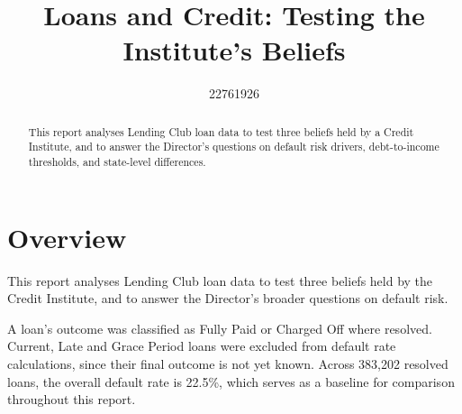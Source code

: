 \documentclass[11pt,preprint]{elsarticle}
\numberwithin{equation}{section}
\numberwithin{figure}{section}
\numberwithin{table}{section}
\begin{document}
\begin{frontmatter}  %

\title{Loans and Credit: Testing the Institute's Beliefs}





\author[Add1]{22761926}





\address[Add1]{Stellenbosch University}


\begin{abstract}
\small{
This report analyses Lending Club loan data to test three beliefs held
by a Credit Institute, and to answer the Director's questions on default
risk drivers, debt-to-income thresholds, and state-level differences.
}
\end{abstract}

\vspace{1cm}





\vspace{0.5cm}

\end{frontmatter}

\setcounter{footnote}{0}



\pagestyle{fancy}
\chead{}
\rhead{}
\lfoot{}
\lhead{}
\cfoot{}


\headsep 35pt %




\section{Overview}\label{overview}

This report analyses Lending Club loan data to test three beliefs held
by the Credit Institute, and to answer the Director's broader questions
on default risk.

A loan's outcome was classified as Fully Paid or Charged Off where
resolved. Current, Late and Grace Period loans were excluded from
default rate calculations, since their final outcome is not yet known.
Across 383,202 resolved loans, the overall default rate is 22.5\%, which
serves as a baseline for comparison throughout this report.
\end{document}
